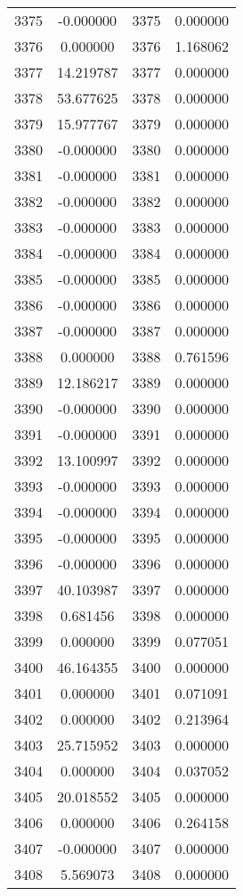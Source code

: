 \documentclass[12pt]{article}
\begin{document}
\begin{longtable}{@{}cccc@{}}
3375 & -0.000000 & 3375 & 0.000000 \\
3376 & 0.000000 & 3376 & 1.168062 \\
3377 & 14.219787 & 3377 & 0.000000 \\
3378 & 53.677625 & 3378 & 0.000000 \\
3379 & 15.977767 & 3379 & 0.000000 \\
3380 & -0.000000 & 3380 & 0.000000 \\
3381 & -0.000000 & 3381 & 0.000000 \\
3382 & -0.000000 & 3382 & 0.000000 \\
3383 & -0.000000 & 3383 & 0.000000 \\
3384 & -0.000000 & 3384 & 0.000000 \\
3385 & -0.000000 & 3385 & 0.000000 \\
3386 & -0.000000 & 3386 & 0.000000 \\
3387 & -0.000000 & 3387 & 0.000000 \\
3388 & 0.000000 & 3388 & 0.761596 \\
3389 & 12.186217 & 3389 & 0.000000 \\
3390 & -0.000000 & 3390 & 0.000000 \\
3391 & -0.000000 & 3391 & 0.000000 \\
3392 & 13.100997 & 3392 & 0.000000 \\
3393 & -0.000000 & 3393 & 0.000000 \\
3394 & -0.000000 & 3394 & 0.000000 \\
3395 & -0.000000 & 3395 & 0.000000 \\
3396 & -0.000000 & 3396 & 0.000000 \\
3397 & 40.103987 & 3397 & 0.000000 \\
3398 & 0.681456 & 3398 & 0.000000 \\
3399 & 0.000000 & 3399 & 0.077051 \\
3400 & 46.164355 & 3400 & 0.000000 \\
3401 & 0.000000 & 3401 & 0.071091 \\
3402 & 0.000000 & 3402 & 0.213964 \\
3403 & 25.715952 & 3403 & 0.000000 \\
3404 & 0.000000 & 3404 & 0.037052 \\
3405 & 20.018552 & 3405 & 0.000000 \\
3406 & 0.000000 & 3406 & 0.264158 \\
3407 & -0.000000 & 3407 & 0.000000 \\
3408 & 5.569073 & 3408 & 0.000000 \\

\end{longtable}
\end{document}

